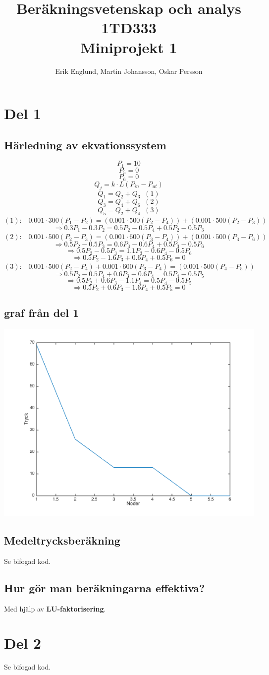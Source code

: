 \documentclass[12pt, a4paper]{report}
\title{Beräkningsvetenskap och analys 1TD333\\Miniprojekt 1}
\author{Erik Englund, Martin Johansson, Oskar Persson}
\begin{document}
\maketitle
\chapter{Del 1}
\section{Härledning av ekvationssystem}

$$P_1 = 10$$
$$P_5 = 0$$
$$P_6 = 0$$
$$Q_j = k \cdot L(P_{in} - P_{ut})$$
$$Q_1 = Q_2 + Q_3\;\;(1)$$
$$Q_3 = Q_4 + Q_6\;\;(2)$$
$$Q_5 = Q_2 + Q_4\;\;(3)$$
\newline
$(1):\;\;\; 0.001\cdot300(P_1-P_2)=(0.001\cdot500(P_2-P_4))+(0.001\cdot500(P_2-P_3))$
$$\Rightarrow0.3P_1-0.3P_2=0.5P_2-0.5P_4+0.5P_2-0.5P_3$$
\newline
$(2):\;\;\; 0.001\cdot500(P_2-P_3)=(0.001\cdot600(P_3-P_4))+(0.001\cdot500(P_3-P_6))$
$$\Rightarrow0.5P_2-0.5P_3=0.6P_3-0.6P_4+0.5P_3-0.5P_6$$
$$\Rightarrow0.5P_2-0.5P_3=1.1P_3-0.6P_4-0.5P_6$$
$$\Rightarrow0.5P_2-1.6P_3+0.6P_4+0.5P_6=0$$
\newline
$(3):\;\;\; 0.001\cdot500(P_2-P_4)+0.001\cdot600(P_3-P_4)=(0.001\cdot500(P_4-P_5))$
$$\Rightarrow0.5P_2-0.5P_4+0.6P_3-0.6P_4=0.5P_4-0.5P_5$$
$$\Rightarrow0.5P_2+0.6P_3-1.1P_4=0.5P_4-0.5P_5$$
$$\Rightarrow0.5P_2+0.6P_3-1.6P_4+0.5P_5=0$$

\section{graf från del 1}

\includegraphics{del1_plot.png}

\section{Medeltrycksberäkning}

Se bifogad kod.

\section{Hur gör man beräkningarna effektiva?}

Med hjälp av \textbf{LU-faktorisering}.

\chapter{Del 2}

Se bifogad kod.
\end{document}

